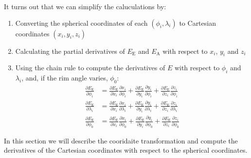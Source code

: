 \documentclass{article}
\newcommand{\EE}{\ensuremath{E_\mathrm{E}}\xspace}
\newcommand{\EA}{\ensuremath{E_\mathrm{A}}\xspace}
\begin{document}
It turns out that we can simplify the caluculations by:
\begin{enumerate}
\item Converting the spherical coordinates of each $(\phi_i, \lambda_i)$ to
   Cartesian coordinates $(x_i, y_i, z_i)$
 \item Calculating the partial derivatives of $\EE$ and $\EA$ with
   respect to $x_i$, $y_i$ and $z_i$
 \item Using the chain rule to compute the derivatives of $E$ with
   respect to $\phi_i$ and $\lambda_i$, and, if the rim angle varies,
   $\phi_0$:
\begin{equation}
  \begin{split} 
  \frac{\partial\EE}{\partial \phi_i} &  =
  \frac{\partial\EE}{\partial x_i}\frac{\partial x_i}{\partial
    \phi_i}
  +   \frac{\partial\EE}{\partial y_i}\frac{\partial y_i}{\partial
    \phi_i}
    +   \frac{\partial\EE}{\partial z_i}\frac{\partial z_i}{\partial
    \phi_i} \\
  \frac{\partial\EE}{\partial \lambda_i} &  =
  \frac{\partial\EE}{\partial x_i}\frac{\partial x_i}{\partial
    \lambda_i}
  +   \frac{\partial\EE}{\partial y_i}\frac{\partial y_i}{\partial
    \lambda_i}
    +   \frac{\partial\EE}{\partial z_i}\frac{\partial z_i}{\partial
      \lambda_i} \\
    \frac{\partial\EE}{\partial \phi_0} &  =
  \frac{\partial\EE}{\partial x_i}\frac{\partial x_i}{\partial
    \phi_0}
  +   \frac{\partial\EE}{\partial y_i}\frac{\partial y_i}{\partial
    \phi_0}
    +   \frac{\partial\EE}{\partial z_i}\frac{\partial z_i}{\partial
    \phi_0}
  \end{split}
\end{equation}
\end{enumerate}
In this section we will describe the cooridaite transformation and
compute the derivatives of the Cartesian coordinates with respect to
the spherical coordinates.
\end{document}
